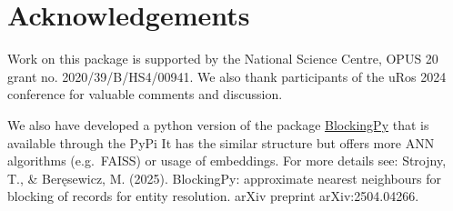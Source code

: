 \section{Acknowledgements}\label{acknowledgements}

Work on this package is supported by the National Science Centre, OPUS
20 grant no. 2020/39/B/HS4/00941. We also thank participants of the uRos
2024 conference for valuable comments and discussion.

We also have developed a python version of the package
\href{https://blockingpy.readthedocs.io/en/latest/}{BlockingPy} that is
available through the PyPi It has the similar structure but offers more
ANN algorithms (e.g.~FAISS) or usage of embeddings. For more details
see: Strojny, T., \& Beręsewicz, M. (2025). BlockingPy: approximate
nearest neighbours for blocking of records for entity resolution. arXiv
preprint arXiv:2504.04266.



\address{%
Maciej Beręsewicz\\
University of Economics and BusinessStatisical Office in Poznań\\%
Department of Statistics\\ Centre for the Methodology of Population Studies\\
%
\url{https://maciejberesewicz.com}\\%
\textit{ORCiD: \href{https://orcid.org/0000-0002-8281-4301}{0000-0002-8281-4301}}\\%
\href{mailto:maciej.beresewicz@poznan.pl}{\nolinkurl{maciej.beresewicz@poznan.pl}}%
}

\address{%
Adam Struzik\\
Adam Mickiewicz UniversityStatisical Office in Poznań\\%
Faculty of Mathematics and Computer Science\\ Centre for Urban Statistics\\
%
%
%
\href{mailto:adastr5@st.amu.edu.pl}{\nolinkurl{adastr5@st.amu.edu.pl}}%
}
